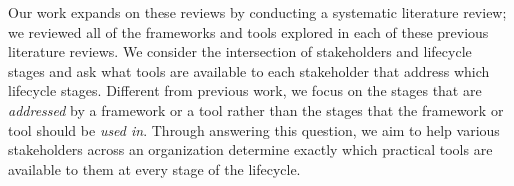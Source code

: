 Our work expands on these reviews by conducting a systematic literature review; we reviewed all of the frameworks and tools explored in each of these previous literature reviews. 
We consider the intersection of stakeholders and lifecycle stages and ask what tools are available to each stakeholder that address which lifecycle stages. Different from previous work, we focus on the stages that are \emph{addressed} by a framework or a tool rather than the stages that the framework or tool should be \emph{used in}.
Through answering this question, we aim to help various stakeholders across an organization determine exactly which practical tools are available to them at every stage of the lifecycle.







